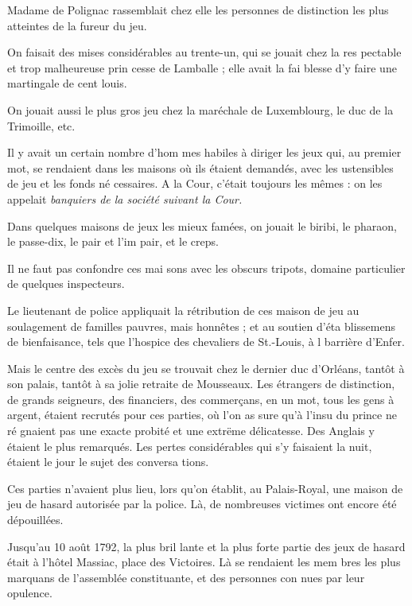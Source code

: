 Madame de Polignac rassemblait
chez elle les personnes de distinction
les plus atteintes de la fureur du jeu.

On faisait des mises considérables
au trente-un, qui se jouait chez la res%
pectable et trop malheureuse prin%
cesse de Lamballe ; elle avait la fai%
blesse d'y faire une martingale de cent
louis.

On jouait aussi le plus gros jeu chez
la maréchale de Luxemblourg, le duc
de la Trimoille, etc.

Il y avait un certain nombre d'hom%
mes habiles à diriger les jeux qui, au
premier mot, se rendaient dans les
maisons où ils étaient demandés, avec
les ustensibles de jeu et les fonds né%
cessaires. A la Cour, c'était toujours
les mêmes : on les appelait \emph{banquiers
de la société suivant la Cour.}

Dans quelques maisons de jeux les
mieux famées, on jouait le biribi, le
pharaon, le passe-dix, le pair et l'im%
pair, et le creps.

Il ne faut pas confondre ces mai%
sons avec les obscurs tripots, domaine
particulier de quelques inspecteurs.

Le lieutenant de police appliquait
la rétribution de ces maison de jeu
au soulagement de familles pauvres,
mais honnêtes ; et au soutien d'éta%
blissemens de bienfaisance, tels que
l'hospice des chevaliers de St.-Louis,
à l barrière d'Enfer.

Mais le centre des excès du jeu se
trouvait chez le dernier duc d'Orléans,
tantôt à son palais, tantôt à sa jolie
retraite de Mousseaux. Les étrangers
de distinction, de grands seigneurs,
des financiers, des commerçans, en
un mot, tous les gens à argent, étaient
recrutés pour ces parties, où l'on as%
sure qu'à l'insu du prince ne ré%
gnaient pas une exacte probité et une
extrëme délicatesse. Des Anglais y
étaient le plus remarqués. Les pertes
considérables qui s'y faisaient la nuit,
étaient le jour le sujet des conversa%
tions.

Ces parties n'avaient plus lieu, lors%
qu'on établit, au Palais-Royal, une
maison de jeu de hasard autorisée par
la police. Là, de nombreuses victimes
ont encore été dépouillées.

Jusqu'au 10 août 1792, la plus bril%
lante et la plus forte partie des jeux de
hasard était à l'hôtel Massiac, place
des Victoires. Là se rendaient les mem%
bres les plus marquans de l'assemblée
constituante, et des personnes con%
nues par leur opulence.

